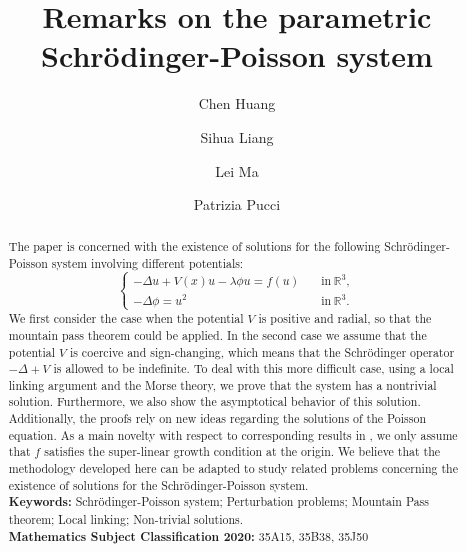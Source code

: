 \documentclass[12pt]{amsart}
\numberwithin{equation}{section}
\theoremstyle{definition}
\begin{document}
	\title[On the parametric Schr\"{o}dinger-Poisson system]{Remarks on the parametric Schr\"{o}dinger-Poisson system}
	
\author{Chen Huang}
\address{College of Science, University of Shanghai for Science and Technology, Shanghai, 200093, China}
\author{Sihua Liang}
\address{College of Mathematics, Changchun Normal University, Changchun, Jilin, 130032, China}
\author{Lei Ma}
\address{College of Science, University of Shanghai for Science and Technology, Shanghai, 200093, China}
\author{Patrizia Pucci}
\address{Department of Mathematics and Computer Science, University of Perugia, Via Vanvitelli 1, 06123 Perugia, Italy}
	\date{}
	\begin{abstract} The paper is concerned with the existence of solutions for the following Schr\"{o}dinger-Poisson system involving different potentials:
	\begin{equation*}
	\begin{cases}
			-\Delta u+V(x)u-\lambda \phi u=f(u)&\quad\text{in}~\mathbb R^3,\\
		-\Delta\phi=u^2&\quad\text{in}~\mathbb R^3.
	\end{cases}
\end{equation*}
 We first consider the case when the potential  $V$ is positive and radial, so that the mountain pass theorem could be applied. In the second case we assume that the potential $V$ is coercive and sign-changing, which means that the Schr\"{o}dinger operator $-\Delta +V$ is allowed to be indefinite. To deal with this more difficult case, using a local linking argument and the Morse theory, we
 prove that the system has a nontrivial solution. Furthermore, we also show the asymptotical behavior of this solution. Additionally, the proofs rely on new ideas regarding the solutions of the Poisson equation.
As a main novelty with respect to corresponding results in \cite{MR4527586, MR3148130, MR2810583}, we only assume that $f$ satisfies the super-linear growth condition at the origin.
We believe that the methodology developed here can be adapted to study related problems concerning the existence of solutions for the Schr\"{o}dinger-Poisson system.
\\[3mm]{\bf Keywords:} Schr\"{o}dinger-Poisson system; Perturbation problems; Mountain Pass theorem; Local linking; Non-trivial solutions.
		 	\\[3mm]{\bf Mathematics Subject Classification 2020:} 35A15, 35B38, 35J50
	\end{abstract}
	\maketitle
\end{document}
